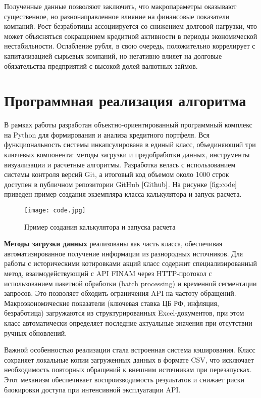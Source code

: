 \documentclass[]{article}
\begin{document}
	Полученные данные позволяют заключить, что макропараметры оказывают существенное, но разнонаправленное влияние на финансовые показатели компаний. Рост безработицы ассоциируется со снижением долговой нагрузки, что может объясняться сокращением кредитной активности в периоды экономической нестабильности. Ослабление рубля, в свою очередь, положительно коррелирует с капитализацией сырьевых компаний, но негативно влияет на долговые обязательства предприятий с высокой долей валютных займов.
	
	\section{Программная реализация алгоритма}
	
	В рамках работы разработан объектно-ориентированный программный комплекс на Python для формирования и анализа кредитного портфеля. Вся функциональность системы инкапсулирована в единый класс, объединяющий три ключевых компонента: методы загрузки и предобработки данных, инструменты визуализации и расчетные алгоритмы. Разработка велась с использованием системы контроля версий Git, а итоговый код объемом около 1000 строк доступен в публичном репозитории GitHub $\cite{Github}$.
	На рисунке $\ref{fig:code}$ приведен пример создания экземпляра класса калькулятора и запуск расчета.
	
	
	\begin{figure}[ht] %
		\centering %
		\texttt{[image: code.jpg]} %
		\caption{Пример создания калькулятора и запуска расчета} %
		\label{fig:code} %
	\end{figure}
	
	
	\textbf{Методы загрузки данных} реализованы как часть класса, обеспечивая автоматизированное получение информации из разнородных источников. Для работы с историческими котировками акций класс содержит специализированный метод, взаимодействующий с API FINAM через HTTP-протокол с использованием пакетной обработки (batch processing) и временной сегментации запросов. Это позволяет обходить ограничения API на частоту обращений. Макроэкономические показатели (ключевая ставка ЦБ РФ, инфляция, безработица) загружаются из структурированных Excel-документов, при этом класс автоматически определяет последние актуальные значения при отсутствии ручных обновлений.
	
	Важной особенностью реализации стала встроенная система кэширования. Класс сохраняет локальные копии загруженных данных в формате CSV, что исключает необходимость повторных обращений к внешним источникам при перезапусках. Этот механизм обеспечивает воспроизводимость результатов и снижает риски блокировки доступа при интенсивной эксплуатации API.
	
\end{document}
